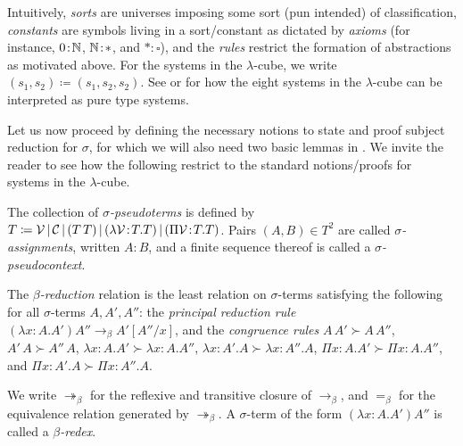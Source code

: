 \documentclass[reqno, twoside]{article}
\begin{document}
    Intuitively, \textit{sorts} are universes imposing some sort (pun intended) of classification, \textit{constants} are symbols living in a sort/constant as dictated by \textit{axioms} (for instance, $0\!:\!\mathbb{N}$, $\mathbb{N}\!:\!\ast$, and $\ast\!:\!\square$), and the \textit{rules} restrict the formation of abstractions as motivated above. For the systems in the $\lambda$-cube, we write $(s_1,s_2)\coloneqq(s_1,s_2,s_2)$. See \cite{Bar91} or \cite{Bar92} for how the eight systems in the $\lambda$-cube can be interpreted as pure type systems.

    Let us now proceed by defining the necessary notions to state and proof subject reduction for $\sigma$, for which we will also need two basic lemmas in \cite{GN91}. We invite the reader to see how the following restrict to the standard notions/proofs for systems in the $\lambda$-cube.

    \begin{definition}
        The collection of \textit{$\sigma$-pseudoterms} is defined by $T\coloneqq\mathcal{V}\,|\,\mathcal{C}\,|\,(T\,T)\,|\,(\lambda\mathcal{V}\!:\!T.T)\,|\,(\Pi\mathcal{V}\!:\!T.T)$. Pairs $(A,B)\in T^2$ are called \textit{$\sigma$-assignments}, written $A\!:\!B$, and a finite sequence thereof is called a \textit{$\sigma$-pseudocontext}.
    \end{definition}

    \begin{definition}
        The \textit{$\beta$-reduction} relation is the least relation on $\sigma$-terms satisfying the following for all $\sigma$-terms $A,A',A''$: the \textit{principal reduction rule} $(\lambda x\!:\!A.A')A''\rightarrow_\beta A'[A''/x]$, and the \textit{congruence rules} $A\,A'\succ A\,A''$, $A'\,A\succ A''\,A$, $\lambda x\!:\!A.A'\succ\lambda x\!:\!A.A''$, $\lambda x\!:\!A'.A\succ\lambda x\!:\!A''.A$, $\Pi x\!:\!A.A'\succ\Pi x\!:\!A.A''$, and $\Pi x\!:\!A'.A\succ\Pi x\!:\!A''.A$.
    \end{definition}

    \begin{notation}
        We write $\twoheadrightarrow_\beta$ for the reflexive and transitive closure of $\rightarrow_\beta$, and $=_\beta$ for the equivalence relation generated by $\twoheadrightarrow_\beta$. A $\sigma$-term of the form $(\lambda x\!:\!A.A')A''$ is called a \textit{$\beta$-redex}.
    \end{notation}
\end{document}
